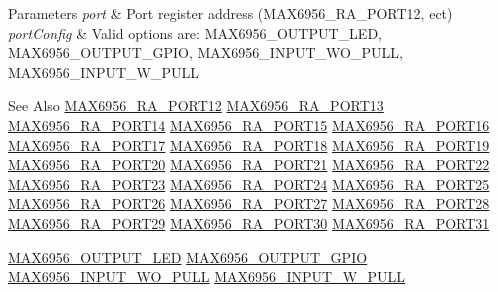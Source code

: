\begin{DoxyParams}{Parameters}
{\em port} & Port register address (M\-A\-X6956\-\_\-\-R\-A\-\_\-\-P\-O\-R\-T12, ect) \\
\hline
{\em port\-Config} & Valid options are\-: M\-A\-X6956\-\_\-\-O\-U\-T\-P\-U\-T\-\_\-\-L\-E\-D, M\-A\-X6956\-\_\-\-O\-U\-T\-P\-U\-T\-\_\-\-G\-P\-I\-O, M\-A\-X6956\-\_\-\-I\-N\-P\-U\-T\-\_\-\-W\-O\-\_\-\-P\-U\-L\-L, M\-A\-X6956\-\_\-\-I\-N\-P\-U\-T\-\_\-\-W\-\_\-\-P\-U\-L\-L \\
\hline
\end{DoxyParams}
\begin{DoxySeeAlso}{See Also}
\hyperlink{MAX6956_8h_a3c089b77cbd25ffa27e3cd46af415a9c}{M\-A\-X6956\-\_\-\-R\-A\-\_\-\-P\-O\-R\-T12} \hyperlink{MAX6956_8h_a2d6ee01536f1fb0ec843479948141cbc}{M\-A\-X6956\-\_\-\-R\-A\-\_\-\-P\-O\-R\-T13} \hyperlink{MAX6956_8h_aba5e5ff9b4aea95fedff9f6421c5f47c}{M\-A\-X6956\-\_\-\-R\-A\-\_\-\-P\-O\-R\-T14} \hyperlink{MAX6956_8h_ad366a7c1b65fb3496f5b9ba392d6ba9c}{M\-A\-X6956\-\_\-\-R\-A\-\_\-\-P\-O\-R\-T15} \hyperlink{MAX6956_8h_ac483e6007b4e6a780c14c7a78ff7a134}{M\-A\-X6956\-\_\-\-R\-A\-\_\-\-P\-O\-R\-T16} \hyperlink{MAX6956_8h_ab6f3b8bbd8ac56bacf4a57691eb41aaf}{M\-A\-X6956\-\_\-\-R\-A\-\_\-\-P\-O\-R\-T17} \hyperlink{MAX6956_8h_a082486ab9eace7838acd56b6ac6301df}{M\-A\-X6956\-\_\-\-R\-A\-\_\-\-P\-O\-R\-T18} \hyperlink{MAX6956_8h_a04e65b34862a48ae022c994bbc5968dd}{M\-A\-X6956\-\_\-\-R\-A\-\_\-\-P\-O\-R\-T19} \hyperlink{MAX6956_8h_aed99f35f5ba961711c4e5bed769aa369}{M\-A\-X6956\-\_\-\-R\-A\-\_\-\-P\-O\-R\-T20} \hyperlink{MAX6956_8h_a361dcd71b3da6c5fb57d33951c9e4c54}{M\-A\-X6956\-\_\-\-R\-A\-\_\-\-P\-O\-R\-T21} \hyperlink{MAX6956_8h_a67c57767c9f6eda6124ff7368df4293b}{M\-A\-X6956\-\_\-\-R\-A\-\_\-\-P\-O\-R\-T22} \hyperlink{MAX6956_8h_a29699b356f81b9fc971a29fc04e68a59}{M\-A\-X6956\-\_\-\-R\-A\-\_\-\-P\-O\-R\-T23} \hyperlink{MAX6956_8h_ad053ff9eac065beaa10ad52dcc3d1e3e}{M\-A\-X6956\-\_\-\-R\-A\-\_\-\-P\-O\-R\-T24} \hyperlink{MAX6956_8h_a367103a7d8364b916a70f37d0880e334}{M\-A\-X6956\-\_\-\-R\-A\-\_\-\-P\-O\-R\-T25} \hyperlink{MAX6956_8h_ae0c19d326ab47406a138d4b66c601de0}{M\-A\-X6956\-\_\-\-R\-A\-\_\-\-P\-O\-R\-T26} \hyperlink{MAX6956_8h_ae1219ad62d3ea1b3a86c52736d347618}{M\-A\-X6956\-\_\-\-R\-A\-\_\-\-P\-O\-R\-T27} \hyperlink{MAX6956_8h_a07ff69092b95f43595762554c3e35329}{M\-A\-X6956\-\_\-\-R\-A\-\_\-\-P\-O\-R\-T28} \hyperlink{MAX6956_8h_a6be82fa185d6c3dd272200727c15f4ac}{M\-A\-X6956\-\_\-\-R\-A\-\_\-\-P\-O\-R\-T29} \hyperlink{MAX6956_8h_a34c02dca8e8a97488eb0be51f682cf73}{M\-A\-X6956\-\_\-\-R\-A\-\_\-\-P\-O\-R\-T30} \hyperlink{MAX6956_8h_a891d2a47a2fe5a4da056a7732fb6098b}{M\-A\-X6956\-\_\-\-R\-A\-\_\-\-P\-O\-R\-T31} 

\hyperlink{MAX6956_8h_ad6490a909085059c4300a51dcebbf7bc}{M\-A\-X6956\-\_\-\-O\-U\-T\-P\-U\-T\-\_\-\-L\-E\-D} \hyperlink{MAX6956_8h_a27f6ca524d4c18623762c722d9993c10}{M\-A\-X6956\-\_\-\-O\-U\-T\-P\-U\-T\-\_\-\-G\-P\-I\-O} \hyperlink{MAX6956_8h_ab05f3186e2515bab3a536ad9f1cbb7db}{M\-A\-X6956\-\_\-\-I\-N\-P\-U\-T\-\_\-\-W\-O\-\_\-\-P\-U\-L\-L} \hyperlink{MAX6956_8h_a68fc1bc750b7959fbab7e64f79589b83}{M\-A\-X6956\-\_\-\-I\-N\-P\-U\-T\-\_\-\-W\-\_\-\-P\-U\-L\-L} 
\end{DoxySeeAlso}


